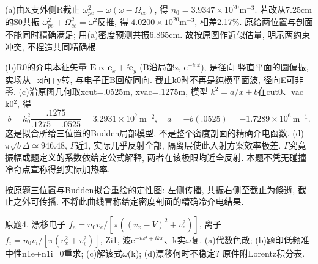 \begin{solution}
(a)由X支外侧R截止 $\omega_{pe}^2=\omega(\omega-\Omega_{ce})$, 得 $n_0=3.9347\times10^{20}$m$^{-3}$. 若改从7.25cm的S0共振 $\omega_{pe}^2+\Omega_{ce}^2=\omega^2$反推, 得 $4.0200\times10^{20}$m$^{-3}$, 相差2.17\%. 原给两位置与剖面不能同时精确满足; 用(a)密度预测共振6.865cm. 故按原图作近似估量, 明示两约束冲突, 不捏造共同精确根.

(b)R0的介电本征矢量 $\mathbf E\propto\mathbf e_x+\ii\mathbf e_y$ (B沿局部z, e$^{-i\ensuremath{\omega}t}$), 是径向-竖直平面的圆偏振, 实场从+x向+y转, 与电子正B回旋同向. 截止k0时不再是纯横平面波, 径向E可非零. (c)沿原图几何取xcut=.0525m, xvac=.1275m, 模型 $k^2=a/x+b$在cut0、vac k0\ensuremath{{}^{2}}, 得
\begin{equation}
 b=k_0^2\frac{.1275}{.1275-.0525}=3.2931\times10^7\,\mathrm m^{-2},\quad
 a=-b(.0525)=-1.7289\times10^6\,\mathrm m^{-1}.
\end{equation}
这是拟合所给三位置的Budden局部模型, 不是整个密度剖面的精确介电函数. (d)$\pi\sqrt b\Delta\simeq946.48$, \ensuremath{\Gamma}近1, 实际几乎反射全部, 隔离层使此入射方案效率极差. \ensuremath{\Gamma}究竟振幅或题定义的系数依给定公式解释, 两者在该极限均近全反射. 本题不凭无碰撞冷奇点宣称得到实际加热率.

\begin{center}\end{center}
按原题三位置与Budden拟合重绘的定性图: 左侧传播, 共振右侧至截止为倏逝, 截止之外可传播. 不将此曲线冒称给定密度剖面的精确冷介电结果.
\end{solution}
\begin{exercise}\label{ex:06-final-4}
原题4. 漂移电子 $f_e=n_0v_e/[\pi((v_x-V)^2+v_e^2)]$, 离子 $f_i=n_0v_i/[\pi(v_x^2+v_i^2)]$, Zi1, 波e$^{-i\ensuremath{\omega}t+ikx}$、k实\ensuremath{\omega}复. (a)代数色散; (b)题印低频准中性n1e+n1i=0重求; (c)解该式\ensuremath{\omega}(k); (d)漂移何时不稳定? 原件附Lorentz积分表.
\end{exercise}
